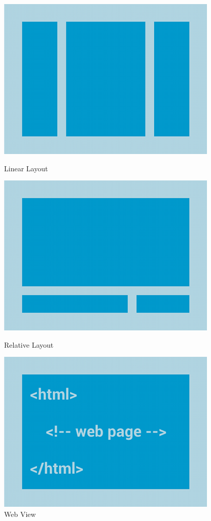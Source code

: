 \begin{figure}[!htb]
  \includegraphics[width=\linewidth]{02-layouts/linearlayout.png}
  \caption{Linear Layout}
\endminipage\hfill
{}
  \includegraphics[width=\linewidth]{02-layouts/relativelayout.png}
  \caption{Relative Layout}
\endminipage\hfill
{}
  \includegraphics[width=\linewidth]{02-layouts/webview.png}
  \caption{Web View}
\endminipage
\end{figure}

